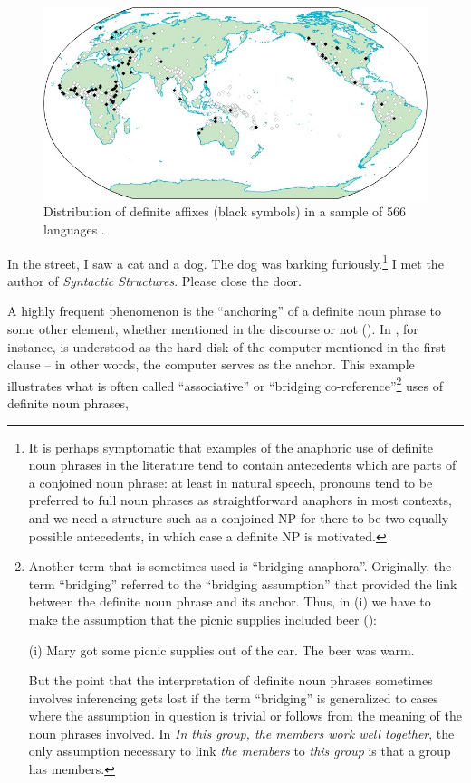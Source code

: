 \begin{figure}
\includegraphics[height=.3\textheight]{figures/11_DistributionDefAffixes}
\caption{Distribution of definite affixes (black symbols) in a sample of 566 languages \citep{Dryer2005}.}
\label{map:8}
\end{figure}

\ea 
	\gl	\label{bkm:Ref93745057}In the street, I saw a cat and a dog. The dog was barking furiously.\footnote{ It is perhaps symptomatic that examples of the anaphoric use of definite noun phrases in the literature tend to contain antecedents which are parts of a conjoined noun phrase: at least in natural speech, pronouns tend to be preferred to full noun phrases as straightforward anaphors in most contexts, and we need a structure such as a conjoined NP for there to be two equally possible antecedents, in which case a definite NP is motivated.}
\z 
\ea 
	\gl	\label{bkm:Ref93745078}I met the author of \textit{Syntactic Structures}.
\z 
\ea 
	\gl \label{bkm:Ref93745091}Please close the door. 
\z 

A highly frequent phenomenon is the “anchoring” of a definite noun phrase to some other element, whether mentioned in the discourse or not (\citet[25]{Fraurud1992}). In , for instance,  is understood as the hard disk of the computer mentioned in the first clause – in other words, the computer serves as the anchor.  This example illustrates what is often called “associative” or “bridging co-reference”\footnote{ Another term that is sometimes used is “bridging anaphora”. Originally, the term “bridging” referred to the “bridging assumption” that provided the link between the definite noun phrase and its anchor. Thus, in (i) we have to make the assumption that the picnic supplies included beer (\citet{ClarkEtAl1974}):\par (i) Mary got some picnic supplies out of the car. The beer was warm. \par But the point that the interpretation of definite noun phrases sometimes involves inferencing gets lost if the term “bridging” is generalized to cases where the assumption in question is trivial or follows from the meaning of the noun phrases involved. In \textit{In this group, the members work well together}, the only assumption necessary to link \textit{the members} to \textit{this group} is that a group has members. } uses of definite noun phrases,

